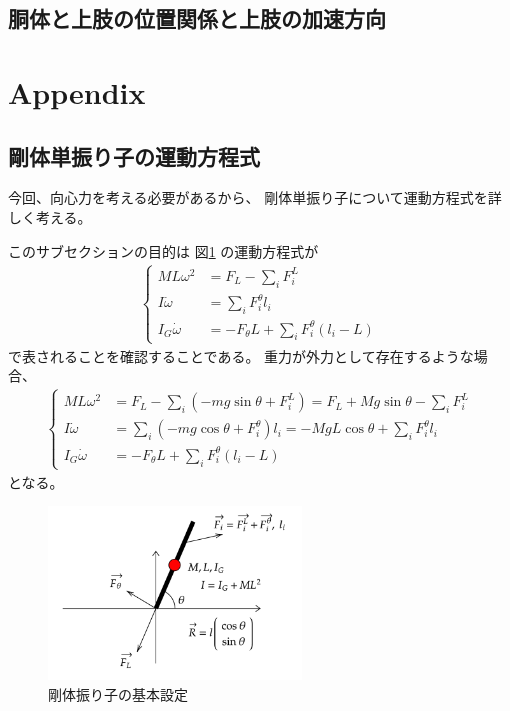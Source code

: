 \documentclass[a4paper,11pt]{jsarticle}
\begin{document}
\subsection{胴体と上肢の位置関係と上肢の加速方向}

\clearpage
\section{Appendix}
\label{sec:appendix}
\subsection{剛体単振り子の運動方程式}
今回、向心力を考える必要があるから、
剛体単振り子について運動方程式を詳しく考える。

このサブセクションの目的は
図\ref*{Appendix_base_config.png}
の運動方程式が
\begin{align}
  \begin{cases}
    ML\omega^2  &= F_L - \sum_i F_i^L
    \\
    I\dot\omega &= \sum_i F_i^\theta l_i
    \\
    I_G\dot\omega &= -F_\theta L + \sum_i F_i^\theta ( l_i - L )
  \end{cases}
\end{align}
で表されることを確認することである。
重力が外力として存在するような場合、
\begin{align}
  \begin{cases}
    ML\omega^2  &= F_L - \sum_i ( -mg\sin\theta + F_i^L ) = F_L + Mg\sin\theta - \sum_i F_i^L
    \\
    I\dot\omega &= \sum_i ( -mg\cos\theta + F_i^\theta ) l_i = -MgL\cos\theta + \sum_i F_i^\theta l_i
    \\
    I_G\dot\omega &= -F_\theta L + \sum_i F_i^\theta ( l_i - L )
  \end{cases}
\end{align}
となる。


\begin{figure}[h]
  \centering
  \includegraphics[width = 0.6\textwidth]{Appendix_base_config.png}
  \caption{剛体振り子の基本設定}
  \label{Appendix_base_config.png}
\end{figure}
\end{document}
